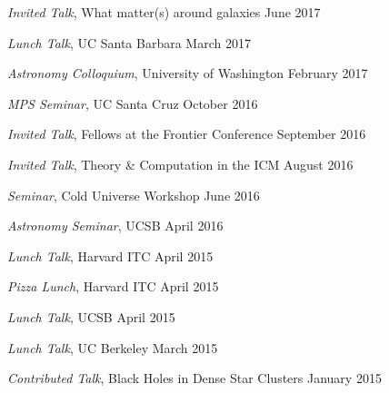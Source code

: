 \begin{talkenum}

\item \textit{Invited Talk}, What matter(s) around galaxies \hspace*{\fill} June 2017

\item \textit{Lunch Talk}, UC Santa Barbara \hspace*{\fill} March 2017

\item \textit{Astronomy Colloquium}, University of Washington \hspace*{\fill} February 2017

\item \textit{MPS Seminar}, UC Santa Cruz \hspace*{\fill} October 2016

\item \textit{Invited Talk}, Fellows at the Frontier Conference \hspace*{\fill} September 2016

\item \textit{Invited Talk}, Theory \& Computation in the ICM \hspace*{\fill} August 2016

\item \textit{Seminar}, Cold Universe Workshop \hspace*{\fill} June 2016

\item \textit{Astronomy Seminar}, UCSB \hspace*{\fill} April 2016

\item \textit{Lunch Talk}, Harvard ITC \hspace*{\fill} April 2015

\item \textit{Pizza Lunch}, Harvard ITC \hspace*{\fill} April 2015

\item \textit{Lunch Talk}, UCSB \hspace*{\fill} April 2015

\item \textit{Lunch Talk}, UC Berkeley \hspace*{\fill} March 2015

\item \textit{Contributed Talk}, Black Holes in Dense Star Clusters \hspace*{\fill} January 2015


\end{talkenum}
